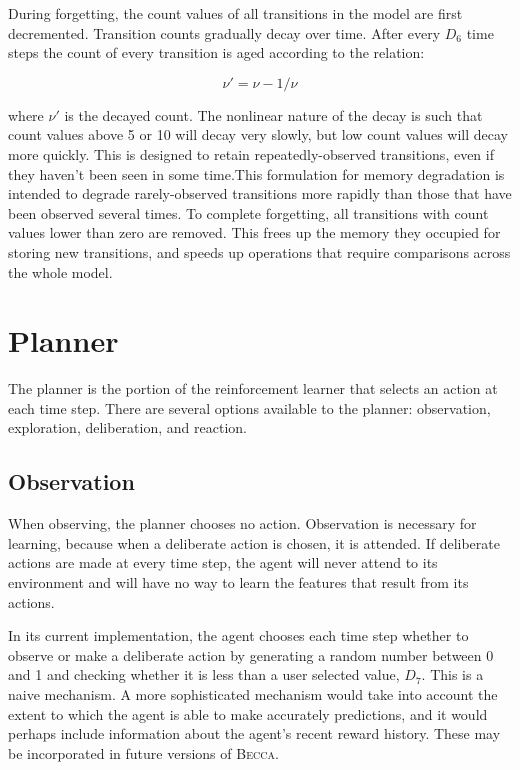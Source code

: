 During forgetting, the count values of all transitions in the model are first decremented. Transition counts gradually decay over time. After every $D_6$ time steps  the count of every transition is aged according to the relation:

\begin{equation}
\nu' = \nu - 1/\nu
\end{equation}

where $\nu'$ is the decayed count. The nonlinear nature of the decay is such that count values above 5 or 10 will decay very slowly, but low count values will decay more quickly. This is designed to retain repeatedly-observed transitions, even if they haven't been seen in some time.This formulation for memory degradation is intended to degrade rarely-observed transitions more rapidly than those that have been observed several times.  To complete forgetting, all transitions with count values lower than zero are removed. This frees up the memory they occupied for storing new transitions, and speeds up operations that require comparisons across the whole model.


\section{Planner}
The planner is the portion of the reinforcement learner that selects an action at each time step. There are several options available to the planner: observation, exploration, deliberation, and reaction.

\subsection{Observation}
When observing, the planner chooses no action. Observation is necessary for learning, because when a deliberate action is chosen, it is attended. If deliberate actions are made at every time step, the agent will never attend to its environment and will have no way to learn the features that result from its actions.

In its current implementation, the agent chooses each time step whether to observe or make a deliberate action by generating a random number between 0 and 1 and checking whether it is less than a user selected value, $D_7$. This is a naive mechanism. A more sophisticated mechanism would take into account the extent to which the agent is able to make accurately predictions, and it would perhaps include information about the agent's recent reward history. These may be incorporated in future versions of \textsc{Becca}.


